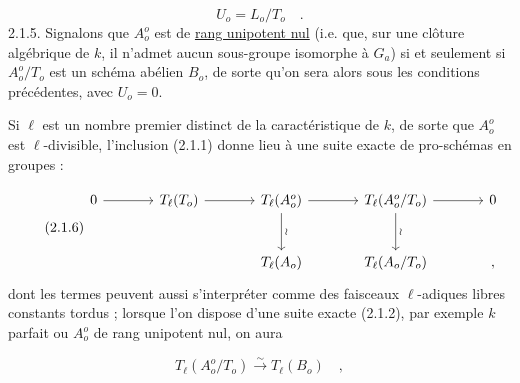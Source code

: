 \begin{equation}\tag{2.1.4}
U_o = L_o/T_o \quad .
\end{equation}
2.1.5. Signalons que $A_o^o$ est de \underline{rang unipotent nul} (i.e. que, sur une clôture algébrique de $k$, il n'admet aucun sous-groupe isomorphe à $G_a$) si et seulement si $A_o^o/T_o$ est un schéma abélien $B_o$, de sorte qu'on sera alors sous les conditions précédentes, avec $U_o = 0$.

Si $\ell$ est un nombre premier distinct de la caractéristique de $k$, de sorte que $A_o^o$ est $\ell$-divisible, l'inclusion (2.1.1) donne lieu à une suite exacte de pro-schémas en groupes :

\begin{equation}\tag{2.1.6}
\begin{tikzcd}[row sep=large, column sep=large]
0 \arrow[r] & T_\ell(T_o) \arrow[r] & T_\ell(A_o^o) \arrow[r] \arrow[d, "\wr"] & T_\ell(A_o^o/T_o) \arrow[r] \arrow[d, "\wr"] & 0 \\
& & T_\ell(A_o) & T_\ell(A_o/T_o) & {,}
\end{tikzcd}
\end{equation}
dont les termes peuvent aussi s'interpréter comme des faisceaux $\ell$-adiques libres constants tordus ; lorsque l'on dispose d'une suite exacte (2.1.2), par exemple $k$ parfait ou $A_o^o$ de rang unipotent nul, on aura

\begin{equation}\tag{2.1.7}
T_\ell(A_o^o/T_o) \overset{\sim}{\longrightarrow} T_\ell(B_o) \quad ,
\end{equation}

